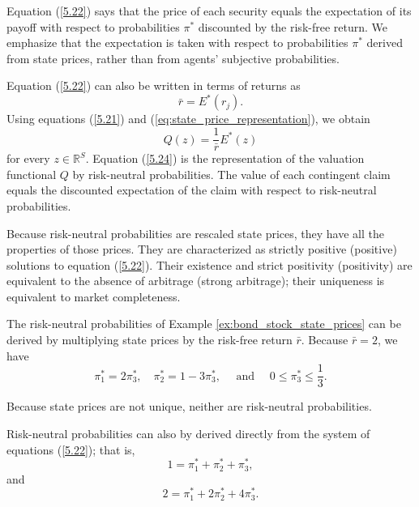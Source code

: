 \documentclass[\topdir/lecture\_notes.tex]{subfiles}
\begin{document}
Equation (\ref{5.22}) says that the price of each security equals the expectation of its payoff with respect to probabilities \(\pi^{*}\) discounted by the risk-free return. We emphasize that the expectation is taken with respect to probabilities \(\pi^{*}\) derived from state prices, rather than from agents' subjective probabilities.

Equation (\ref{5.22}) can also be written in terms of returns as
\begin{equation*}
\bar{r}=E^{*}(r_{j}) . 
\end{equation*}
Using equations (\ref{5.21}) and (\ref{eq:state_price_representation}), we obtain
\begin{equation}
Q(z)=\frac{1}{\bar{r}} E^{*}(z) \label{5.24}
\end{equation}
for every \(z \in \mathbb{R}^{S}\). Equation (\ref{5.24}) is the representation of the valuation functional \(Q\) by risk-neutral probabilities. The value of each contingent claim equals the discounted expectation of the claim with respect to risk-neutral probabilities.

Because risk-neutral probabilities are rescaled state prices, they have all the properties of those prices. They are characterized as strictly positive (positive) solutions to equation (\ref{5.22}). Their existence and strict positivity (positivity) are equivalent to the absence of arbitrage (strong arbitrage); their uniqueness is equivalent to market completeness.

\begin{example}\label{ex:risk_neutral_calculation}
The risk-neutral probabilities of Example \ref{ex:bond_stock_state_prices} can be derived by multiplying state prices by the risk-free return \(\bar{r}\). Because \(\bar{r}=2\), we have
\begin{equation*}
\pi_{1}^{*}=2 \pi_{3}^{*}, \quad \pi_{2}^{*}=1-3 \pi_{3}^{*}, \quad \text { and } \quad 0 \leq \pi_{3}^{*} \leq \frac{1}{3} . 
\end{equation*}

Because state prices are not unique, neither are risk-neutral probabilities.

Risk-neutral probabilities can also by derived directly from the system of equations (\ref{5.22}); that is,
\begin{equation*}
1=\pi_{1}^{*}+\pi_{2}^{*}+\pi_{3}^{*}, 
\end{equation*}
and
\begin{equation*}
2=\pi_{1}^{*}+2 \pi_{2}^{*}+4 \pi_{3}^{*} . 
\end{equation*}
\end{example}
\end{document}
